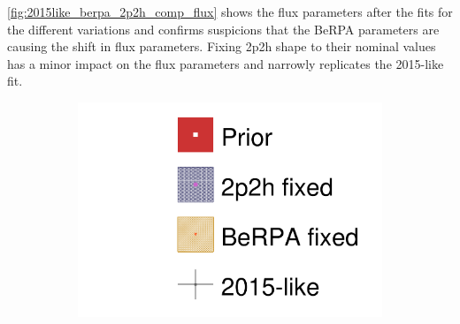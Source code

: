 \autoref{fig:2015like_berpa_2p2h_comp_flux} shows the flux parameters after the fits for the different variations and confirms suspicions that the BeRPA parameters are causing the shift in flux parameters. Fixing 2p2h shape to their nominal values has a minor impact on the flux parameters and narrowly replicates the 2015-like fit.
\begin{figure}[h]
	\begin{subfigure}[t]{0.1\textwidth}
		\includegraphics[width=\textwidth, trim={0mm 0mm 0mm 0mm}, clip,page=1]{figures/mach3/data/alt/2017b_NewData_NewDet_hpc_2p2hshapeFix_0_2017b_NewData_NewDet_hpc_BeRPAfix_0_2017b_NewData_NewDet_hpc_2015like_0.pdf}
	\end{subfigure}
	

\end{figure}
